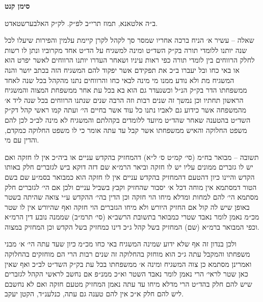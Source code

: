 \documentclass[12pt, openany]{book}
\newcommand{\chapname}{}
\newcommand{\newchap}[1]{
	\addcontentsline{toc}{chapter}{#1}
	\renewcommand{\chapname}{#1}
		\begin{center}
			\textbf{%
\fontsize{16pt}{16pt}\selectfont
				#1}
		\end{center}
}
\begin{document}
\newchap{סימן קנט}
\begin{multicols}{2}
ב״ה אלטאנא, תמוז תרי״ב לפ״ק. לק״ק האלבערשטאדט.\\\vspace{0pt}

שאלה – עשיר א׳ הניח ברכה אחריו שמסר סך לקהל לקרן קיימת עלמין והפירות שיעלו לכל שנה יותנו ללומדי תורה בק״ק השד״ט ומינה למשגיח על הד״ט אחד מקרוביו ונתן לו רשות לחלק הרווחים בין לומדי תורה כפי ראות עיניו ושאחר העדרו יותנו הרווחים לאשר יפרט הוא או באי כחו ובל יעברו ב״כ את תפקידם אשר יפקוד להם המשגיח הזה בכתב יושר והנה המשגיח מת ולא נודע ממנו מי מינה לבאי כחו והרווחים נתנו מהקהל בכל שנה לאחד ממשפחתו הדר בק״ק הנ״ל וכשנעדר גם הוא בא בכל עת אחר ממשפחת המצוה והמשגיח הראשון תחתיו וכן נמשך זה שנים רבות וזה הרבה שנים שנתנו הרווחים בכל שנה ליד א׳ מהמשפחה אשר כידוע גם לאביו נתנו כל עוד אשר בחיים הי׳ ועתה קמו ראשי קהל דק״ק השד״ט בהטענה שאחר שהד״ט מיועד ללומדים בקהלתם והמשגיח לא מינה לב״כ לכן להם משפט החלוקה והאיש ממשפחתו אשר קבל עד עתה אומר כי לו משפט החלוקה כמקדם, והדין עם מי.\\\vspace{0pt}

תשובה – מבואר בח״מ (סי׳ קמ״ט ס׳ ל״א) דהמחזיק בהקדש עניים או ביה״כ אין לו חזקה ואם יש לו גזברים ממונים עליו יש לו חזקה וביאר הרמ״א שם דזה דוקא ביש לגזברים חלק באותו הקדש והיינו כיון דהטעם דהמחזיק בהקדש עניים אין לו חזקה הוא כמבואר בסמ״ע שם בשם הטור דמסתמא אין מוחה דכל א׳ יסבור שהחזיק וקבץ בשביל עניים ולכן אם הי׳ לגזברים חלק מסתמא הי׳ להם למחות ומדלא מיחו הוי חזקה וכן הדין בהי׳ ההקדש ע״י צואה שהיתה בשטר באופן שיש לה קול אם החזיק היורש ולא מיחו הגזברים הוי חזקה ואף שהיורש אין לו שטר מכ״מ נאמן לומר נאבד שטרי כמבואר בתשובת הרשב״א (סי׳ תרמ״ב) שממנה נובע דין הרמ״א וכפי המבואר ברמ״א (שם) המחזיק בשל קהל ג״כ דינו כמחזיק בשל הקדש וכן המחזיק במצוה.\\\vspace{0pt}

ולכן בנדון זה אף שלא ידוע שמינה המשגיח באי כחו מכ״מ כיון שעד עתה הי׳ א׳ מבני משפחתו והמקבל עתה ג״כ הוא מוחזק בהחלוקה זה שנים רבות הרי הם מוחזקים בהחלוקה ואמרינן מסתמא כן צוה המשגיח ומינה א׳ ממשפחתו בכל עת בק״ק השד״ט לב״כ ואף שאין כאן שטר לראי׳ הרי נאמן לומר נאבד השטר וא״כ ממנ״פ אם נחשב לראשי הקהל לגזברים שיש להם חלק בהד״ט הרי מדלא מיחו עד עתה נאמן המחזיק מטעם חזקה ואם לא נחשבם ליש להם חלק א״כ אין להם טענה גם עתה, כנלענ״ד, הקטן יעקב.\\\vspace{0pt}

\end{multicols}\newpage
\end{document}
